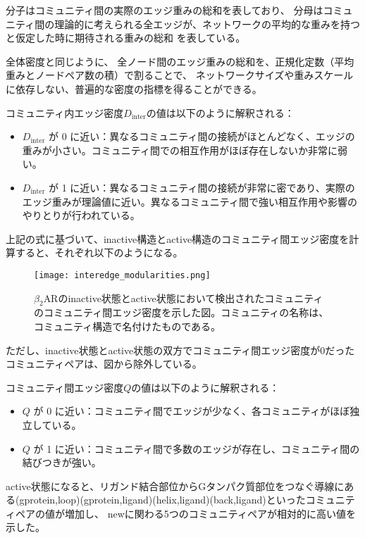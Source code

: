 分子はコミュニティ間の実際のエッジ重みの総和を表しており、
分母はコミュニティ間の理論的に考えられる全エッジが、ネットワークの平均的な重みを持つと仮定した時に期待される重みの総和
を表している。

全体密度と同じように、
全ノード間のエッジ重みの総和を、正規化定数（平均重みとノードペア数の積）で割ることで、
ネットワークサイズや重みスケールに依存しない、普遍的な密度の指標を得ることができる。


コミュニティ内エッジ密度$D_{\text{inter}}$の値は以下のように解釈される：
\begin{itemize}
    \item \( D_{\text{inter}} \) が 0 に近い：異なるコミュニティ間の接続がほとんどなく、エッジの重みが小さい。コミュニティ間での相互作用がほぼ存在しないか非常に弱い。
    \item \( D_{\text{inter}} \) が 1 に近い：異なるコミュニティ間の接続が非常に密であり、実際のエッジ重みが理論値に近い。異なるコミュニティ間で強い相互作用や影響のやりとりが行われている。
\end{itemize}


上記の式に基づいて、inactive構造とactive構造のコミュニティ間エッジ密度を計算すると、それぞれ以下のようになる。

\begin{figure}[htbp]
    \centering
    \texttt{[image: interedge\_modularities.png]}
    \caption{$\beta_2$ARのinactive状態とactive状態において検出されたコミュニティのコミュニティ間エッジ密度を示した図。コミュニティの名称は、コミュニティ構造で名付けたものである。}
    \label{fig:inter}
\end{figure}

\newpage

ただし、inactive状態とactive状態の双方でコミュニティ間エッジ密度が0だったコミュニティペアは、図から除外している。

コミュニティ間エッジ密度$Q$の値は以下のように解釈される：
\begin{itemize}
    \item \( Q \) が 0 に近い：コミュニティ間でエッジが少なく、各コミュニティがほぼ独立している。
    \item \( Q \) が 1 に近い：コミュニティ間で多数のエッジが存在し、コミュニティ間の結びつきが強い。
\end{itemize}

active状態になると、リガンド結合部位からGタンパク質部位をつなぐ導線にある(gprotein,loop)(gprotein,ligand)(helix,ligand)(back,ligand)といったコミュニティペアの値が増加し、
newに関わる5つのコミュニティペアが相対的に高い値を示した。


